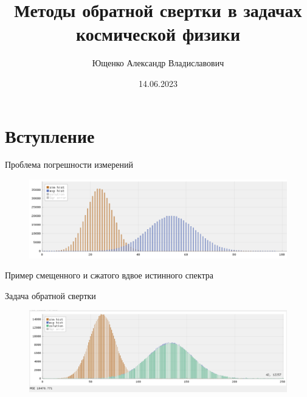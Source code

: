 \documentclass[fullscreen=true,russian,compress,%
	hyperref={unicode,bookmarks=false}]{presentation}
\begin{document}

\title[Методы обратной свертки в задачах космической физики]{Методы обратной свертки в задачах \\ космической физики}
\author{Ющенко Александр Владиславович}
\date{14.06.2023}

\begin{frame}
\titlepage
\end{frame}


\section{Вступление}

\begin{frame}{Проблема погрешности измерений}


\begin{figure}[!ht]
   \includegraphics[width=\linewidth]{images/gaus_dist.png}
\end{figure}
Пример смещенного и сжатого вдвое истинного спектра

\end{frame}


\begin{frame}{Задача обратной свертки}

   \begin{figure}[!ht]
      \includegraphics[width=\linewidth]{images/example_regulazation.png}
   \end{figure}
   
\end{frame}
\end{document}
